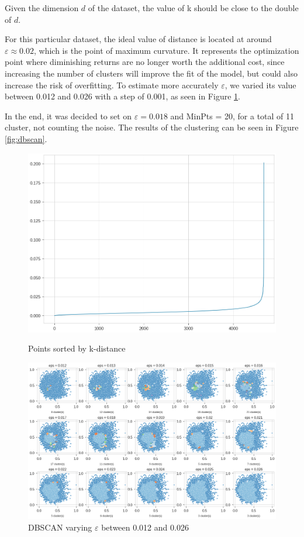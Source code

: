 \documentclass[a4paper,11pt,dvipsnames]{article}
\begin{document}
Given the dimension $d$ of the dataset, the value of k should be close to the double of $d$\cite{Sander1998}. 

For this particular dataset, the ideal value of distance is located at around $\varepsilon\approx 0.02$, which is the point of maximum curvature. It represents the optimization point where diminishing returns are no longer worth the additional cost, since increasing the number of clusters will improve the fit of the model, but could also increase the risk of overfitting. To estimate more accurately $\varepsilon$, we varied its value between 0.012 and 0.026 with a step of 0.001, as seen in Figure \ref{fig:vareps}. 

In the end, it was decided to set on $\varepsilon= 0.018$ and MinPts = 20, for a total of 11 cluster, not counting the noise. The results of the clustering can be seen in Figure \ref{fig:dbscan}.

\begin{figure}[h]
\centering
    \begin{minipage}[b]{.4\linewidth}
    \includegraphics[width=\textwidth]{kth_neighbors.png}
    \caption{Points sorted by k-distance}
    \label{fig:eps}
    \end{minipage}
    \hfil
    \begin{minipage}[b]{.59\linewidth}
    \includegraphics[width=\textwidth]{dibi.png}
     \caption{DBSCAN varying $\varepsilon$ between 0.012 and 0.026}
    \label{fig:vareps}
    \end{minipage}
\end{figure}
\end{document}
